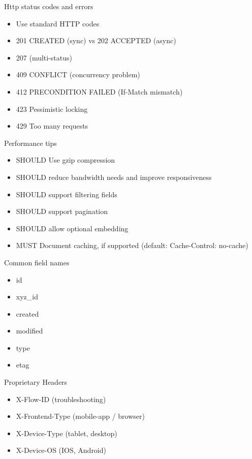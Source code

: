 \begin{frame}{Http status codes and errors}

\begin{itemize}
\tightlist
\item
  Use standard HTTP codes
\item
  201 CREATED (sync) vs 202 ACCEPTED (async)
\item
  207 (multi-status)
\item
  409 CONFLICT (concurrency problem)
\item
  412 PRECONDITION FAILED (If-Match mismatch)
\item
  423 Pessimistic locking
\item
  429 Too many requests
\end{itemize}

\end{frame}

\begin{frame}{Performance tips}

\begin{itemize}
\tightlist
\item
  SHOULD Use gzip compression
\item
  SHOULD reduce bandwidth needs and improve responsiveness
\item
  SHOULD support filtering fields
\item
  SHOULD support pagination
\item
  SHOULD allow optional embedding
\item
  MUST Document caching, if supported (default: Cache-Control: no-cache)
\end{itemize}

\end{frame}

\begin{frame}{Common field names}

\begin{itemize}
\tightlist
\item
  id
\item
  xyz\_id
\item
  created
\item
  modified
\item
  type
\item
  etag
\end{itemize}

\end{frame}

\begin{frame}{Proprietary Headers}

\begin{itemize}
\tightlist
\item
  X-Flow-ID (troubleshooting)
\item
  X-Frontend-Type (mobile-app / browser)
\item
  X-Device-Type (tablet, desktop)
\item
  X-Device-OS (IOS, Android)
\end{itemize}

\end{frame}

